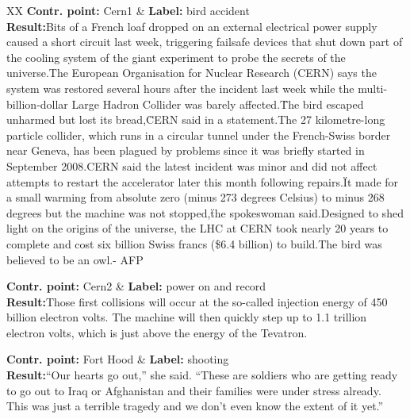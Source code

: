 
\begin{table*}[htbp]
	\centering
	\begin{tabularx}{\textwidth}{XX}
\hline
\textbf{Contr. point:} Cern1 & \textbf{Label:} bird accident\\
	{\textbf{Result:}Bits of a French loaf dropped on an external electrical power supply caused a short circuit last week, triggering failsafe devices that shut down part of the cooling system of the giant experiment to probe the secrets of the universe.The European Organisation for Nuclear Research (CERN) says the system was restored several hours after the incident last week while the multi-billion-dollar Large Hadron Collider was barely affected.\"The bird escaped unharmed but lost its bread,\" CERN said in a statement.The 27 kilometre-long particle collider, which runs in a circular tunnel under the French-Swiss border near Geneva, has been plagued by problems since it was briefly started in September 2008.CERN said the latest incident was minor and did not affect attempts to restart the accelerator later this month following repairs.\"It made for a small warming from absolute zero (minus 273 degrees Celsius) to minus 268 degrees but the machine was not stopped,\" the spokeswoman said.Designed to shed light on the origins of the universe, the LHC at CERN took nearly 20 years to complete and cost six billion Swiss francs (\$6.4 billion) to build.The bird was believed to be an owl.- AFP}
 \\
\hline


\textbf{Contr. point:} Cern2 & \textbf{Label:} power on and record \\
{\textbf{Result:}Those first collisions will occur at the so-called injection energy of 450 billion electron volts.  The machine will then quickly step up to 1.1 trillion electron volts, which is just above the energy of the Tevatron.} \\
\hline

\textbf{Contr. point:} Fort Hood & \textbf{Label:} shooting \\
{\textbf{Result:}“Our hearts go out,” she said. “These are soldiers who are getting ready to go out to Iraq or Afghanistan and their families were under stress already. This was just a terrible tragedy and we don’t even know the extent of it yet.”} \\
\hline



\end{tabularx}
\end{table*}
